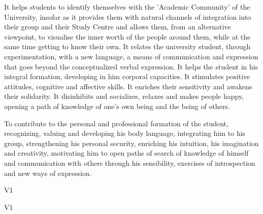\begin{syllabus}


\begin{justification}
	It helps students to identify themselves with the 'Academic Community' of the University, insofar as it provides them with natural channels of integration into their group and their Study Centre and allows them, from an alternative viewpoint, to visualise the inner worth of the people around them, while at the same time getting to know their own.
	It relates the university student, through experimentation, with a new language, a means of communication and expression that goes beyond the conceptualized verbal expression.
	It helps the student in his integral formation, developing in him corporal capacities. It stimulates positive attitudes, cognitive and affective skills. It enriches their sensitivity and awakens their solidarity.
	It disinhibits and socializes, relaxes and makes people happy, opening a path of knowledge of one's own being and the being of others.
\end{justification}

\begin{goals}
\item To contribute to the personal and professional formation of the student, recognizing, valuing and developing his body language, integrating him to his group, strengthening his personal security, enriching his intuition, his imagination and creativity, motivating him to open paths of search of knowledge of himself and communication with others through his sensibility, exercises of introspection and new ways of expression.
\end{goals}

\begin{outcomes}{V1}
    \item {}
    \item {}
\end{outcomes}

\begin{competences}{V1}
    \item {}
    \item {}
    \item {}
\end{competences}


\end{syllabus}
